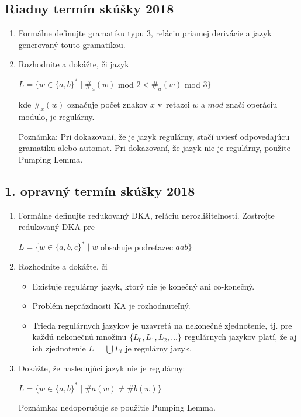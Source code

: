 \documentclass[11pt,a4paper]{article}
\begin{document}
		\subsection{Riadny termín skúšky 2018}

		\begin{enumerate}
			\item Formálne definujte gramatiku typu 3, reláciu priamej derivácie a jazyk generovaný touto gramatikou.

			\item Rozhodnite a dokážte, či jazyk

			$L = \{w \in \{a,b\}^* \mid \#_a(w)$ mod $2 < \#_a(w)$ mod $3\}$
	
			kde $\#_x(w)$ označuje počet znakov $x$ v~reťazci $w$ a $mod$ značí operáciu modulo, je regulárny.
	
			Poznámka: Pri dokazovaní, že je jazyk regulárny, stačí uviesť odpovedajúcu gramatiku alebo automat. Pri dokazovaní, že jazyk nie je regulárny, použite Pumping Lemma.
		\end{enumerate}

		\subsection{1. opravný termín skúšky 2018}

		\begin{enumerate}
			\item Formálne definujte redukovaný DKA, reláciu nerozlišiteľnosti. Zostrojte redukovaný DKA pre

			$L = \{w \in \{a,b,c\}^* \mid w$ obsahuje podreťazec $aab\}$


			\item Rozhodnite a dokážte, či
	
			\begin{itemize}
				\item Existuje regulárny jazyk, ktorý nie je konečný ani co-konečný.
				\item Problém neprázdnosti KA je rozhodnuteľný.
				\item Trieda regulárnych jazykov je uzavretá na nekonečné zjednotenie, tj. pre každú nekonečnú množinu $\{L_0, L_1, L_2, \ldots\}$ regulárnych jazykov platí, že aj ich zjednotenie $L = \bigcup L_i$ je regulárny jazyk.
			\end{itemize}

		 	\item Dokážte, že nasledujúci jazyk nie je regulárny:

			 $L = \{w \in \{a,b\}^* \mid \#a(w) \neq \#b(w)\}$
	
			 Poznámka: nedoporučuje se použitie Pumping Lemma.
		\end{enumerate}
\end{document}

